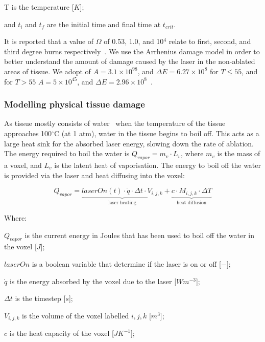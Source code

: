 	\indent T is the temperature [$K$];
	
	\indent and $t_i$ and $t_f$ are the initial time and final time at $t_{crit}$.
	
	\medskip

It is reported that a value of $\Omega$ of 0.53, 1.0, and 10$^4$ relate to first, second, and third degree burns respectively~\cite{diller1983finite}. We use the Arrhenius damage model in order to better understand the amount of damage caused by the laser in the non-ablated areas of tissue. We adopt of $A=3.1\times10^{98}$, and $\Delta E=6.27\times10^8$ for $T\leq55$, and for $T>55$ $A=5\times10^{45}$, and $\Delta E=2.96\times10^8$~\cite{ye2017thermal}.

\subsubsection*{Modelling physical tissue damage}

As tissue mostly consists of water~\cite{meglinski2002quantitative} when the temperature of the tissue approaches 100$^{\circ}$C (at 1 atm), water in the tissue begins to boil off. This acts as a large heat sink for the absorbed laser energy, slowing down the rate of ablation. The energy required to boil the water is $Q_{vapor}=m_v\cdot L_v$, where $m_v$ is the mass of a voxel, and $L_v$ is the latent heat of vaporisation. The energy to boil off the water is provided via the laser and heat diffusing into the voxel:

\begin{equation}
Q_{vapor}=\underbrace{laserOn(t)\cdot\dot{q}\cdot \Delta t\cdot V_{i,j,k}}_\text{laser heating} + \underbrace{c\cdot M_{i,j,k}\cdot\Delta T}_\text{heat diffusion}
\end{equation}

\noindent Where:

	\indent $Q_{vapor}$ is the current energy in Joules that has been used to boil off the water in the voxel [$J$];
	
	\indent $laserOn$ is a boolean variable that determine if the laser is on or off [$-$];
	
	\indent $\dot{q}$ is the energy absorbed by the voxel due to the laser [$W m^{-3}$];
	
	\indent $\Delta t$ is the timestep [$s$];
	
	\indent $V_{i,j,k}$ is the volume of the voxel labelled $i,j,k$ [$m^3$];
	
	\indent $c$ is the heat capacity of the voxel [$J K^{-1}$];
	
